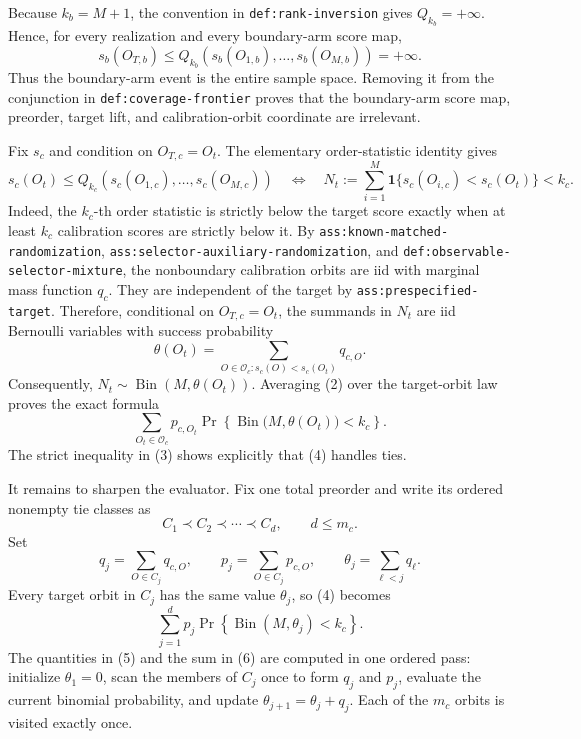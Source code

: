 Because \(k_b=M+1\), the convention in \texttt{def:rank-inversion} gives \(Q_{k_b}=+\infty\). Hence, for every realization and every boundary-arm score map,
\[
s_b(O_{T,b})\le Q_{k_b}(s_b(O_{1,b}),\ldots,s_b(O_{M,b}))=+\infty.
\tag{1}
\]
Thus the boundary-arm event is the entire sample space. Removing it from the conjunction in \texttt{def:coverage-frontier} proves that the boundary-arm score map, preorder, target lift, and calibration-orbit coordinate are irrelevant.

Fix \(s_c\) and condition on \(O_{T,c}=O_t\). The elementary order-statistic identity gives
\[
s_c(O_t)\le Q_{k_c}(s_c(O_{1,c}),\ldots,s_c(O_{M,c}))
\quad\Longleftrightarrow\quad
N_t:=\sum_{i=1}^M\mathbf 1\{s_c(O_{i,c})<s_c(O_t)\}<k_c.
\tag{2}
\]
Indeed, the \(k_c\)-th order statistic is strictly below the target score exactly when at least \(k_c\) calibration scores are strictly below it. By \texttt{ass:known-matched-randomization}, \texttt{ass:selector-auxiliary-randomization}, and \texttt{def:observable-selector-mixture}, the nonboundary calibration orbits are iid with marginal mass function \(q_c\). They are independent of the target by \texttt{ass:prespecified-target}. Therefore, conditional on \(O_{T,c}=O_t\), the summands in \(N_t\) are iid Bernoulli variables with success probability
\[
\theta(O_t)=\sum_{O\in\mathcal O_c:s_c(O)<s_c(O_t)}q_{c,O}.
\tag{3}
\]
Consequently, \(N_t\sim\operatorname{Bin}(M,\theta(O_t))\). Averaging (2) over the target-orbit law proves the exact formula
\[
\sum_{O_t\in\mathcal O_c}p_{c,O_t}
\Pr\!\left\{\operatorname{Bin}\bigl(M,\theta(O_t)\bigr)<k_c\right\}.
\tag{4}
\]
The strict inequality in (3) shows explicitly that (4) handles ties.

It remains to sharpen the evaluator. Fix one total preorder and write its ordered nonempty tie classes as
\[
C_1\prec C_2\prec\cdots\prec C_d,\qquad d\le m_c.
\]
Set
\[
q_j=\sum_{O\in C_j}q_{c,O},\qquad p_j=\sum_{O\in C_j}p_{c,O},\qquad \theta_j=\sum_{\ell<j}q_\ell.
\tag{5}
\]
Every target orbit in \(C_j\) has the same value \(\theta_j\), so (4) becomes
\[
\sum_{j=1}^d p_j\Pr\!\left\{\operatorname{Bin}(M,\theta_j)<k_c\right\}.
\tag{6}
\]
The quantities in (5) and the sum in (6) are computed in one ordered pass: initialize \(\theta_1=0\), scan the members of \(C_j\) once to form \(q_j\) and \(p_j\), evaluate the current binomial probability, and update \(\theta_{j+1}=\theta_j+q_j\). Each of the \(m_c\) orbits is visited exactly once.

